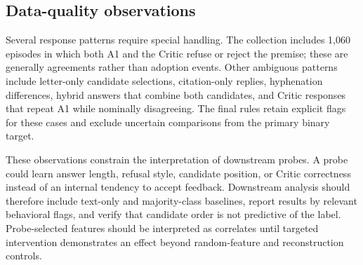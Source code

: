 \subsection{Data-quality observations}

Several response patterns require special handling. The collection includes
1,060 episodes in which both A1 and the Critic refuse or reject the premise;
these are generally agreements rather than adoption events. Other ambiguous
patterns include letter-only candidate selections, citation-only replies,
hyphenation differences, hybrid answers that combine both candidates, and
Critic responses that repeat A1 while nominally disagreeing. The final rules
retain explicit flags for these cases and exclude uncertain comparisons from
the primary binary target.

These observations constrain the interpretation of downstream probes. A probe
could learn answer length, refusal style, candidate position, or Critic
correctness instead of an internal tendency to accept feedback. Downstream
analysis should therefore include text-only and majority-class baselines,
report results by relevant behavioral flags, and verify that candidate order
is not predictive of the label. Probe-selected features should be interpreted
as correlates until targeted intervention demonstrates an effect beyond
random-feature and reconstruction controls.
